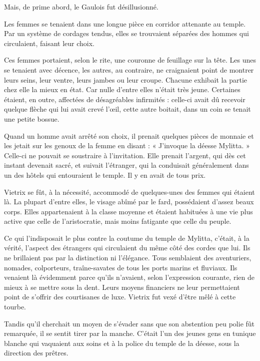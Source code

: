 \documentclass[a4paper, 11pt, oneside, polutonikogreek, french]{article}
\begin{document}
Mais, de prime abord, le Gaulois fut désillusionné.

Les femmes se tenaient dans une longue pièce en corridor attenante au temple. Par un système de cordages tendus, elles se trouvaient séparées des hommes qui circulaient, faisant leur choix.

Ces femmes portaient, selon le rite, une couronne de feuillage sur la tête. Les unes se tenaient avec décence, les autres, au contraire, ne craignaient point de montrer leurs seins, leur ventre, leurs jambes ou leur croupe. Chacune exhibait la partie chez elle la mieux en état. Car nulle d'entre elles n'était très jeune. Certaines étaient, en outre, affectées de désagréables infirmités : celle-ci avait dû recevoir quelque flèche qui lui avait crevé l'œil, cette autre boitait, dans un coin se tenait une petite bossue.

Quand un homme avait arrêté son choix, il prenait quelques pièces de monnaie et les jetait sur les genoux de la femme en disant : « J'invoque la déesse Mylitta. » Celle-ci ne pouvait se soustraire à l'invitation. Elle prenait l'argent, qui dès cet instant devenait sacré, et suivait l'étranger, qui la conduisait généralement dans un des hôtels qui entouraient le temple. Il y en avait de tous prix.

Vietrix se fût, à la nécessité, accommodé de quelques-unes des femmes qui étaient là. La plupart d'entre elles, le visage abîmé par le fard, possédaient d'assez beaux corps. Elles appartenaient à la classe moyenne et étaient habituées à une vie plus active que celle de l'aristocratie, mais moins fatigante que celle du peuple.

Ce qui l'indisposait le plus contre la coutume du temple de Mylitta, c'était, à la vérité, l'aspect des étrangers qui circulaient du même côté des cordes que lui. Ils ne brillaient pas par la distinction ni l'élégance. Tous semblaient des aventuriers, nomades, colporteurs, traîne-savates de tous les ports marins et fluviaux. Ils venaient là évidemment parce qu'ils n'avaient, selon l'expression courante, rien de mieux à se mettre sous la dent. Leurs moyens financiers ne leur permettaient point de s'offrir des courtisanes de luxe. Vietrix fut vexé d'être mêlé à cette tourbe.

\bigskip
\centerline{\EightStarTaper}
\centerline{\EightStarTaper\EightStarTaper}
\bigskip

Tandis qu'il cherchait un moyen de s'évader sans que son abstention peu polie fût remarquée, il se sentit tirer par la manche. C'était l'un des jeunes gens en tunique blanche qui vaquaient aux soins et à la police du temple de la déesse, sous la direction des prêtres.
\end{document}
